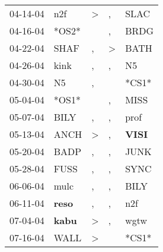 \begin{supertabular}{p{0.07\textwidth}p{0.06\textwidth}p{0.02\textwidth}p{0.02\textwidth}p{0.06\textwidth}}
          04-14-04\textsuperscript{} &            n2f\textsuperscript{} &     \textgreater &                , &           SLAC\textsuperscript{} \\
          04-16-04\textsuperscript{} &                            *OS2* &                  &                , &           BRDG\textsuperscript{} \\
          04-22-04\textsuperscript{} &           SHAF\textsuperscript{} &                , &     \textgreater &           BATH\textsuperscript{} \\
          04-26-04\textsuperscript{} &           kink\textsuperscript{} &                , &                , &             N5\textsuperscript{} \\
          04-30-04\textsuperscript{} &             N5\textsuperscript{} &                , &                  &                            *CS1* \\
          05-04-04\textsuperscript{} &                            *OS1* &                  &                , &           MISS\textsuperscript{} \\
          05-07-04\textsuperscript{} &           BILY\textsuperscript{} &                , &                , &           prof\textsuperscript{} \\
          05-13-04\textsuperscript{} &           ANCH\textsuperscript{} &     \textgreater &                , &  \textbf{VISI\textsuperscript{}} \\
          05-20-04\textsuperscript{} &           BADP\textsuperscript{} &                , &                , &           JUNK\textsuperscript{} \\
          05-28-04\textsuperscript{} &           FUSS\textsuperscript{} &                , &                , &           SYNC\textsuperscript{} \\
          06-06-04\textsuperscript{} &           mulc\textsuperscript{} &                , &                , &           BILY\textsuperscript{} \\
          06-11-04\textsuperscript{} &  \textbf{reso\textsuperscript{}} &                , &                , &            n2f\textsuperscript{} \\
          07-04-04\textsuperscript{} &  \textbf{kabu\textsuperscript{}} &     \textgreater &                , &           wgtw\textsuperscript{} \\
          07-16-04\textsuperscript{} &           WALL\textsuperscript{} &     \textgreater &                  &                            *CS1* \\

\end{supertabular}
